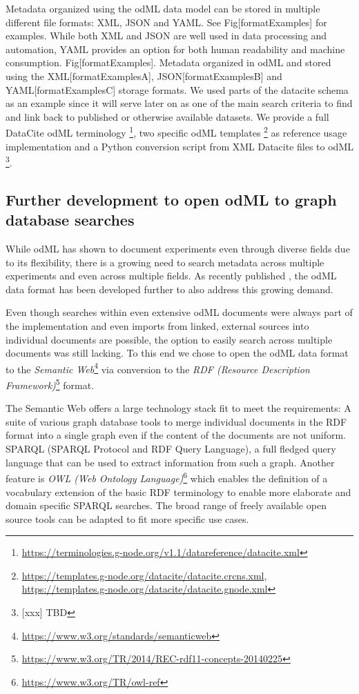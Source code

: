 \documentclass{article}
\begin{document}
Metadata organized using the odML data model can be stored in multiple different file formats: XML, JSON and YAML. See Fig[formatExamples] for examples. While both XML and JSON are well used in data processing and automation, YAML provides an option for both human readability and machine consumption.
Fig[formatExamples]. Metadata organized in odML and stored using the XML[formatExamplesA], JSON[formatExamplesB] and YAML[formatExamplesC] storage formats.
We used parts of the datacite schema as an example since it will serve later on as one of the main search criteria to find and link back to published or otherwise available datasets. We provide a full DataCite odML terminology \footnote{\url{https://terminologies.g-node.org/v1.1/datareference/datacite.xml}}, two specific odML templates \footnote{\url{https://templates.g-node.org/datacite/datacite.crcns.xml}, \url{https://templates.g-node.org/datacite/datacite.gnode.xml}} as reference usage implementation and a Python conversion script from XML Datacite files to odML \footnote{[xxx] TBD}.

\subsection{Further development to open odML to graph database searches} \label{sec::why_rdf}

While odML has shown to document experiments even through diverse fields due to its flexibility, there is a growing need to search metadata across multiple experiments and even across multiple fields. As recently published \cite{Sprenger_2019}, the odML data format has been developed further to also address this growing demand.

Even though searches within even extensive odML documents were always part of the implementation and even imports from linked, external sources into individual documents are possible, the option to easily search across multiple documents was still lacking. To this end we chose to open the odML data format to the \textit{Semantic Web}\footnote{\url{https://www.w3.org/standards/semanticweb}} via conversion to the \textit{RDF (Resource Description Framework)}\footnote{\url{https://www.w3.org/TR/2014/REC-rdf11-concepts-20140225}} format.

The Semantic Web offers a large technology stack fit to meet the requirements: A suite of various graph database tools to merge individual documents in the RDF format into a single graph even if the content of the documents are not uniform. SPARQL (SPARQL Protocol and RDF Query Language), a full fledged query language that can be used to extract information from such a graph. Another feature is \textit{OWL (Web Ontology Language)}\footnote{\url{https://www.w3.org/TR/owl-ref}} which enables the definition of a vocabulary extension of the basic RDF terminology to enable more elaborate and domain specific SPARQL searches. The broad range of freely available open source tools can be adapted to fit more specific use cases.
\end{document}
